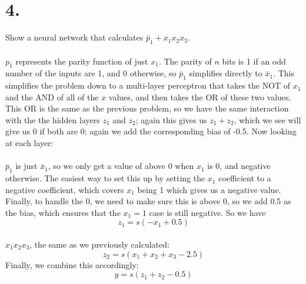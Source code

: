 \documentclass{article}
\begin{document}
{\Large 

\section*{4.}
Show a neural network that calculates \(\bar{p}_1 + x_1 x_2 x_3\). \\ \\
\(p_1\) represents the parity function of just \(x_1\). The parity of \(n\) bits is 1 if an odd number of the inputs are 1, and 0 otherwise, so \(\bar{p}_1\) simplifies directly to \(\bar{x}_1\). This simplifies the problem down to a multi-layer perceptron that takes the NOT of \(x_1\) and the AND of all of the \(x\) values, and then takes the OR of these two values. This OR is the same as the previous problem, so we have the same interaction with the the hidden layers \(z_1\) and \(z_2\); again this gives us \(z_1 + z_2\), which we see will give us 0 if both are 0; again we add the corresponding bias of -0.5. Now looking at each layer: \\ \\
\(\bar{p}_1\) is just \(\bar{x}_1\), so we only get a value of above 0 when \(x_1\) is 0, and negative otherwise. The easiest way to set this up by setting the \(x_1\) coefficient to a negative coefficient, which covers \(x_1\) being 1 which gives us a negative value. Finally, to handle the 0, we need to make sure this is above 0, so we add 0.5 as the bias, which ensures that the \(x_1 = 1\) case is still negative. So we have 
\[
  \boxed{z_1 = s(-x_1 + 0.5)}
\] \\
\(x_1 x_2 x_3\), the same as we previously calculated: 
\[
  \boxed{z_2 = s(x_1 + x_2 + x_3 - 2.5)}
\]
Finally, we combine this accordingly:
\[
  \boxed{y = s(z_1 + z_2 - 0.5)}
\]

}
\end{document}
